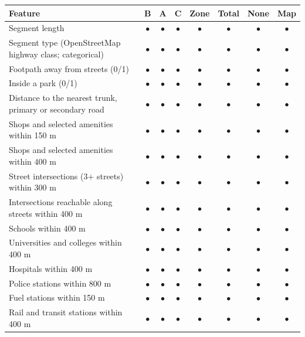 \begin{tabular}{p{}ccccccc}
\toprule
Feature & B & A & C & Zone & Total & None & Map \\
\midrule
Segment length & $\bullet$ & $\bullet$ & $\bullet$ & $\bullet$ & $\bullet$ & $\bullet$ & $\bullet$ \\
Segment type (OpenStreetMap highway class; categorical) & $\bullet$ & $\bullet$ & $\bullet$ & $\bullet$ & $\bullet$ & $\bullet$ & $\bullet$ \\
Footpath away from streets (0/1) & $\bullet$ & $\bullet$ & $\bullet$ & $\bullet$ & $\bullet$ & $\bullet$ & $\bullet$ \\
Inside a park (0/1) & $\bullet$ & $\bullet$ & $\bullet$ & $\bullet$ & $\bullet$ & $\bullet$ & $\bullet$ \\
Distance to the nearest trunk, primary or secondary road & $\bullet$ & $\bullet$ & $\bullet$ & $\bullet$ & $\bullet$ & $\bullet$ & $\bullet$ \\
Shops and selected amenities within 150 m & $\bullet$ & $\bullet$ & $\bullet$ & $\bullet$ & $\bullet$ & $\bullet$ & $\bullet$ \\
Shops and selected amenities within 400 m & $\bullet$ & $\bullet$ & $\bullet$ & $\bullet$ & $\bullet$ & $\bullet$ & $\bullet$ \\
Street intersections (3+ streets) within 300 m & $\bullet$ & $\bullet$ & $\bullet$ & $\bullet$ & $\bullet$ & $\bullet$ & $\bullet$ \\
Intersections reachable along streets within 400 m & $\bullet$ & $\bullet$ & $\bullet$ & $\bullet$ & $\bullet$ & $\bullet$ & $\bullet$ \\
Schools within 400 m & $\bullet$ & $\bullet$ & $\bullet$ & $\bullet$ & $\bullet$ & $\bullet$ & $\bullet$ \\
Universities and colleges within 400 m & $\bullet$ & $\bullet$ & $\bullet$ & $\bullet$ & $\bullet$ & $\bullet$ & $\bullet$ \\
Hospitals within 400 m & $\bullet$ & $\bullet$ & $\bullet$ & $\bullet$ & $\bullet$ & $\bullet$ & $\bullet$ \\
Police stations within 800 m & $\bullet$ & $\bullet$ & $\bullet$ & $\bullet$ & $\bullet$ & $\bullet$ & $\bullet$ \\
Fuel stations within 150 m & $\bullet$ & $\bullet$ & $\bullet$ & $\bullet$ & $\bullet$ & $\bullet$ & $\bullet$ \\
Rail and transit stations within 400 m & $\bullet$ & $\bullet$ & $\bullet$ & $\bullet$ & $\bullet$ & $\bullet$ & $\bullet$ \\

\end{tabular}
